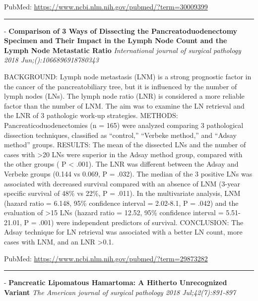 \documentclass[]{article}
\begin{document}
PubMed: \url{https://www.ncbi.nlm.nih.gov/pubmed/?term=30009399}

{}

{}

\begin{center}\rule{0.5\linewidth}{\linethickness}\end{center}

 - \textbf{Comparison of 3 Ways of Dissecting the Pancreatoduodenectomy
Specimen and Their Impact in the Lymph Node Count and the Lymph Node
Metastatic Ratio} \emph{International journal of surgical pathology 2018
Jun;():1066896918780343}

BACKGROUND: Lymph node metastasis (LNM) is a strong prognostic factor in
the cancer of the pancreatobiliary tree, but it is influenced by the
number of lymph nodes (LNs). The lymph node ratio (LNR) is considered a
more reliable factor than the number of LNM. The aim was to examine the
LN retrieval and the LNR of 3 pathologic work-up strategies. METHODS:
Pancreaticoduodenectomies (n = 165) were analyzed comparing 3
pathological dissection techniques, classified as ``control,'' ``Verbeke
method,'' and ``Adsay method'' groups. RESULTS: The mean of the
dissected LNs and the number of cases with \textgreater{}20 LNs were
superior in the Adsay method group, compared with the other groups ( P
\textless{} .001). The LNR was different between the Adsay and Verbeke
groups (0.144 vs 0.069, P = .032). The median of the 3 positive LNs was
associated with decreased survival compared with an absence of LNM
(3-year specific survival of 48\% vs 22\%, P = .011). In the
multivariate analysis, LNM (hazard ratio = 6.148, 95\% confidence
interval = 2.02-8.1, P = .042) and the evaluation of \textgreater{}15
LNs (hazard ratio = 12.52, 95\% confidence interval = 5.51-21.01, P =
.001) were independent predictors of survival. CONCLUSION: The Adsay
technique for LN retrieval was associated with a better LN count, more
cases with LNM, and an LNR \textgreater{}0.1.

PubMed: \url{https://www.ncbi.nlm.nih.gov/pubmed/?term=29873282}

{}

{}

\begin{center}\rule{0.5\linewidth}{\linethickness}\end{center}

 - \textbf{Pancreatic Lipomatous Hamartoma: A Hitherto Unrecognized
Variant} \emph{The American journal of surgical pathology 2018
Jul;42(7):891-897}
\end{document}
